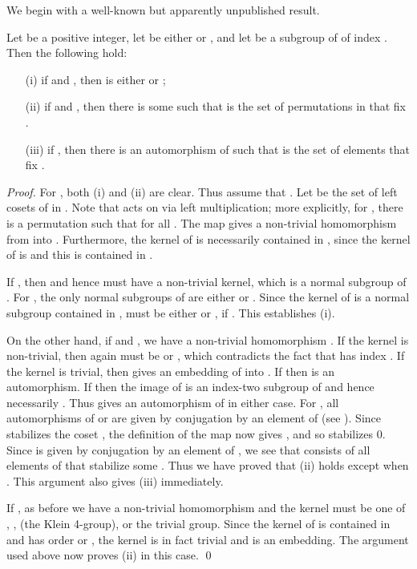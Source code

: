 \documentclass{llncs}
\begin{document}
We begin with a well-known but apparently unpublished result.
\begin{lemma}
Let  be a positive integer, let  be either  or , and let  be a subgroup of  of index .  Then the following hold:
\begin{enumerate}
\item[(i)] if  and , then  is either  or ;
\item[(ii)] if  and , then there is some  such that  is the set of permutations in  that fix .
\item[(iii)] if , then there is an automorphism  of  such that  is the set of elements that fix .\end{enumerate}
\label{lem: bertrand}
\end{lemma}
\begin{proof} For , both (i) and (ii) are clear.  Thus assume that .  
Let  be the set of left cosets of  in .   Note that  acts on  via left multiplication; more explicitly,  for , there is a permutation  such that  for all .  The map  gives a non-trivial homomorphism  from  into .  Furthermore, the kernel of  is necessarily contained in , since the kernel of  is  and this is contained in .    

If , then  and hence  must have a non-trivial kernel, which is a normal subgroup of .  For , the only normal subgroups of  are either  or . Since the kernel of  is a normal subgroup contained in ,   must be either  or , if .   This establishes (i).

On the other hand, if  and ,  we have a non-trivial homomorphism .  If the kernel is non-trivial, then  again  must be  or , which contradicts the fact that  has index .  If the kernel is trivial, then  gives an embedding of  into .  If  then  is an automorphism.  If  then the image of  is an index-two subgroup of  and hence necessarily .  Thus  gives an automorphism of  in either case.  For , all automorphisms of  or  are given by conjugation by an element of  (see \cite[Chapter 3.2]{Suz82}).  Since  stabilizes the coset , the definition of the map  now gives , and so  stabilizes 0.  Since  is given by conjugation by an element of , we see that  consists of all elements of  that stabilize some .  Thus we have proved that (ii) holds except when .  This argument also gives (iii) immediately.  

If , as before we have a non-trivial homomorphism  and the kernel must be one of , ,  (the Klein 4-group), or the trivial group.  Since the kernel of  is contained in  and  has order  or ,  the kernel is in fact trivial and  is an embedding.   The argument used above now proves (ii) in this case.  
\qed  
\end{proof}
\end{document}
